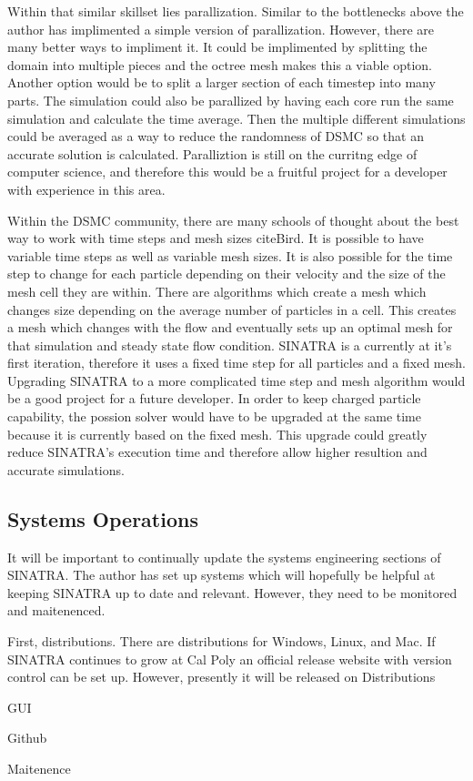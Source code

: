 \indent Within that similar skillset lies parallization. Similar to the bottlenecks above the author has implimented a simple version of parallization. However, there are many better ways to impliment it. It could be implimented by splitting the domain into multiple pieces and the octree mesh makes this a viable option. Another option would be to split a larger section of each timestep into many parts. The simulation could also be parallized by having each core run the same simulation and calculate the time average. Then the multiple different simulations could be averaged as a way to reduce the randomness of DSMC so that an accurate solution is calculated. Paralliztion is still on the curritng edge of computer science, and therefore this would be a fruitful project for a developer with experience in this area. \par

\indent Within the DSMC community, there are many schools of thought about the best way to work with time steps and mesh sizes cite{Bird}. It is possible to have variable time steps as well as variable mesh sizes. It is also possible for the time step to change for each particle depending on their velocity and the size of the mesh cell they are within. There are algorithms which create a mesh which changes size depending on the average number of particles in a cell. This creates a mesh which changes with the flow and eventually sets up an optimal mesh for that simulation and steady state flow condition. SINATRA is a currently at it's first iteration, therefore it uses a fixed time step for all particles and a fixed mesh. Upgrading SINATRA to a more complicated time step and mesh algorithm would be a good project for a future developer. In order to keep charged particle capability, the possion solver would have to be upgraded at the same time because it is currently based on the fixed mesh. This upgrade could greatly reduce SINATRA's execution time and therefore allow higher resultion and accurate simulations. \par

\subsection{Systems Operations}

It will be important to continually update the systems engineering sections of SINATRA. The author has set up systems which will hopefully be helpful at keeping SINATRA up to date and relevant. However, they need to be monitored and maitenenced. \par

\indent First, distributions. There are distributions for Windows, Linux, and Mac. If SINATRA continues to grow at Cal Poly an official release website with version control can be set up. However, presently it will be released on 
Distributions

GUI

Github

Maitenence



